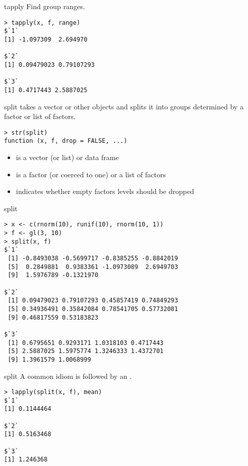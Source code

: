 \documentclass[aspectratio=169]{beamer}
\begin{document}
\begin{frame}[fragile]{tapply}
Find group ranges.
\begin{verbatim}
> tapply(x, f, range)
$`1`
[1] -1.097309  2.694970

$`2`
[1] 0.09479023 0.79107293

$`3`
[1] 0.4717443 2.5887025
\end{verbatim}
\end{frame}


\begin{frame}[fragile]{split}
 takes a vector or other objects and splits it into groups
determined by a factor or list of factors.
\begin{verbatim}
> str(split)
function (x, f, drop = FALSE, ...)  
\end{verbatim}
\begin{itemize}
\item
{} is a vector (or list) or data frame
\item
{} is a factor (or coerced to one) or a list of factors
\item
{} indicates whether empty factors levels should be dropped
\end{itemize}
\end{frame}

\begin{frame}[fragile]{split}
\begin{verbatim}
> x <- c(rnorm(10), runif(10), rnorm(10, 1))
> f <- gl(3, 10)
> split(x, f)
$`1`
 [1] -0.8493038 -0.5699717 -0.8385255 -0.8842019
 [5]  0.2849881  0.9383361 -1.0973089  2.6949703
 [9]  1.5976789 -0.1321970

$`2`
 [1] 0.09479023 0.79107293 0.45857419 0.74849293
 [5] 0.34936491 0.35842084 0.78541705 0.57732081
 [9] 0.46817559 0.53183823

$`3`
 [1] 0.6795651 0.9293171 1.0318103 0.4717443
 [5] 2.5887025 1.5975774 1.3246333 1.4372701
 [9] 1.3961579 1.0068999
\end{verbatim}
\end{frame}

\begin{frame}[fragile]{split}
A common idiom is  followed by an .
\begin{verbatim}
> lapply(split(x, f), mean)
$`1`
[1] 0.1144464

$`2`
[1] 0.5163468

$`3`
[1] 1.246368
\end{verbatim}
\end{frame}
\end{document}
